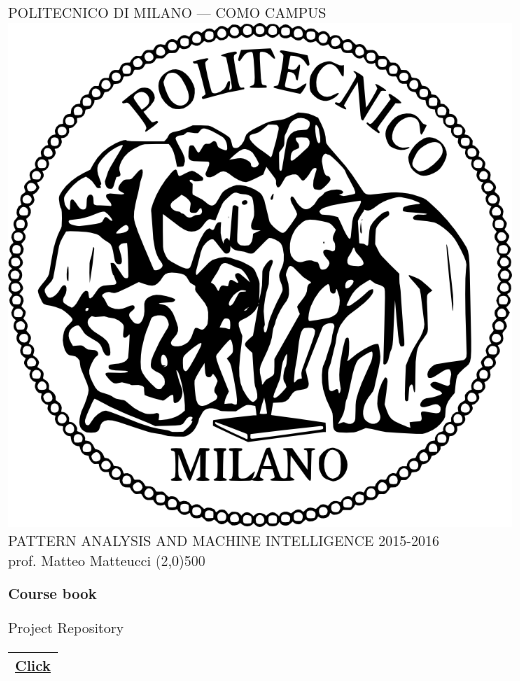 \documentclass[a4paper,12pt,titlepage]{article} %
\begin{document}
\begin{titlepage}

\begin{center}
	POLITECNICO DI MILANO --- COMO CAMPUS\\
	\vspace{10pt}
	\includegraphics[scale=0.1]{logo-polimi.png}\\
	\vspace{10pt}
	PATTERN ANALYSIS AND MACHINE INTELLIGENCE 2015-2016\\
	prof. Matteo Matteucci	
	\line(2,0){500}
\end{center}

\vspace{40pt}

\begin{center}
	{\Huge \textbf{Course book}}\\
\end{center}

\vspace{20pt}

\begin{center}
	{\large Project Repository}
\end{center}
\begin{tabularx}{\textwidth}{|X|}
	\hline
	\href{https://github.com/attillax/PAMI-2015}{Click}\\
	\hline
\end{tabularx}


\end{titlepage}
\end{document}
